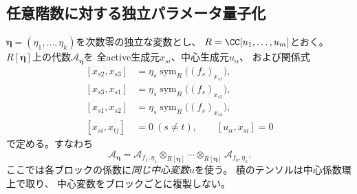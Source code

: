\subsection{任意階数に対する独立パラメータ量子化}
$\boldsymbol\eta=(\eta_1,\ldots,\eta_k)$を次数零の独立な変数とし、
$R=\CC[u_1,\ldots,u_m]$とおく。
$R[\boldsymbol\eta]$上の代数$\mathcal A_{\boldsymbol\eta}$を
全active生成元$x_{si}$、中心生成元$u_\alpha$、
および関係式
\begin{equation}
\begin{aligned}
 [x_{s2},x_{s3}]
 &=\eta_s\operatorname{sym}_R\bigl((f_s)_{x_{s1}}\bigr),\\
 [x_{s3},x_{s1}]
 &=\eta_s\operatorname{sym}_R\bigl((f_s)_{x_{s2}}\bigr),\\
 [x_{s1},x_{s2}]
 &=\eta_s\operatorname{sym}_R\bigl((f_s)_{x_{s3}}\bigr),\\
 [x_{si},x_{tj}]&=0\ (s\ne t),\qquad [u_\alpha,x_{si}]=0
\end{aligned}
\label{eq:pg-ad-relations}
\end{equation}
で定める。すなわち
\begin{equation}
 \mathcal A_{\boldsymbol\eta}
 =\mathcal A_{f_1,\eta_1}
 \otimes_{R[\boldsymbol\eta]}\cdots
 \otimes_{R[\boldsymbol\eta]}\mathcal A_{f_k,\eta_k}.
 \label{eq:pg-ad-tensor}
\end{equation}
ここでは各ブロックの係数に\emph{同じ中心変数$u$}を使う。
積のテンソルは中心係数環上で取り、
中心変数をブロックごとに複製しない。

